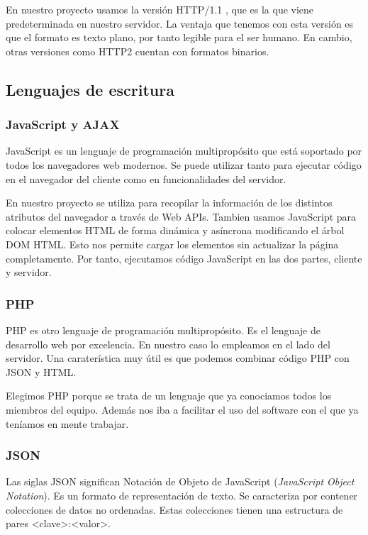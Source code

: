 En nuestro proyecto usamos la versión HTTP/1.1 , que es la que viene predeterminada en nuestro servidor. La ventaja que tenemos con esta versión es que el formato es texto plano, por tanto legible para el ser humano. En cambio, otras versiones como HTTP2 cuentan con formatos binarios.  \par

\subsection{Lenguajes de escritura}

\subsubsection{JavaScript y AJAX}
JavaScript es un lenguaje de programación multipropósito que está soportado por todos los navegadores web modernos. Se puede utilizar tanto para ejecutar código en el navegador del cliente como en funcionalidades del servidor. \par

En nuestro proyecto se utiliza para recopilar la información de los distintos atributos del navegador a través de Web APIs. Tambien usamos JavaScript para  colocar elementos HTML de forma dinámica y asíncrona modificando el árbol DOM HTML. Esto nos permite cargar los elementos sin actualizar la página completamente. Por tanto, ejecutamos código JavaScript en las dos partes, cliente y servidor. \par

\subsubsection{PHP}

PHP es otro lenguaje de programación multipropósito. Es el lenguaje de desarrollo web por excelencia. En nuestro caso lo empleamos en el lado del servidor. Una caraterística muy útil es que podemos combinar código PHP con JSON y HTML. \par 
Elegimos PHP porque se trata de un lenguaje que ya conociamos todos los miembros del equipo. Además nos iba a facilitar el uso del software con el que ya teníamos en mente trabajar. \par 

\subsubsection{JSON}
Las siglas JSON significan Notación de Objeto de JavaScript (\textit{JavaScript Object Notation}). Es un formato de representación de texto. Se caracteriza por contener colecciones de datos no ordenadas. Estas colecciones tienen una estructura de pares <clave>:<valor>.\par

